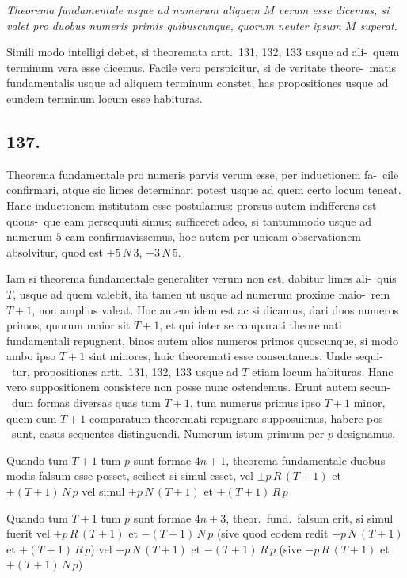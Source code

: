 \documentclass[12pt,a4paper]{article}
\theoremstyle{plain}
\theoremstyle{definition}
\theoremstyle{remark}
\begin{document}
\emph{Theorema fundamentale usque ad numerum aliquem $M$ verum esse dicemus, si
valet pro duobus numeris primis quibuscunque, quorum neuter ipsum $M$ superat.}

Simili modo intelligi debet, si theoremata artt.~131, 132, 133 usque ad ali-\ quem terminum vera esse dicemus. Facile vero perspicitur, si de veritate theore-\ matis fundamentalis usque ad aliquem terminum constet, has propositiones usque
ad eundem terminum locum esse habituras.

\subsection*{137.}

Theorema fundamentale pro numeris parvis verum esse, per inductionem fa-\ cile confirmari, atque sic limes determinari potest usque ad quem certo locum teneat.
Hanc inductionem institutam esse postulamus: prorsus autem indifferens est quous-\ que eam persequuti simus; sufficeret adeo, si tantummodo usque ad numerum $5$
eam confirmavissemus, hoc autem per unicam observationem absolvitur, quod est
$+5 \, N \, 3$, $+3 \, N \, 5$.

Iam si theorema fundamentale generaliter verum non est, dabitur limes ali-\ quis $T$, usque ad quem valebit, ita tamen ut usque ad numerum proxime maio-\ rem $T+1$, non amplius valeat. Hoc autem idem est ac si dicamus, dari duos
numeros primos, quorum maior sit $T+1$, et qui inter se comparati theoremati
fundamentali repugnent, binos autem alios numeros primos quoscunque, si modo
ambo ipso $T+1$ sint minores, huic theoremati esse consentaneos. Unde sequi-\ tur, propositiones artt.~131, 132, 133 usque ad $T$ etiam locum habituras. Hanc
vero suppositionem consistere non posse nunc ostendemus. Erunt autem secun-\ dum formas diversas quas tum $T+1$, tum numerus primus ipso $T+1$ minor,
quem cum $T+1$ comparatum theoremati repugnare supposuimus, habere pos-\ sunt, casus sequentes distinguendi. Numerum istum primum per $p$ designamus.

Quando tum $T+1$ tum $p$ sunt formae $4n+1$, theorema fundamentale
duobus modis falsum esse posset, scilicet si simul esset,
vel $\pm p \, R \, (T+1)$ et $\pm (T+1) \, N \, p$
vel simul $\pm p \, N \, (T+1)$ et $\pm (T+1) \, R \, p$

Quando tum $T+1$ tum $p$ sunt formae $4n+3$, theor.\ fund.\ falsum erit,
si simul fuerit
vel $+p \, R \, (T+1)$ et $-(T+1) \, N \, p$
(sive quod eodem redit $-p \, N \, (T+1)$ et $+(T+1) \, R \, p$)
vel $+p \, N \, (T+1)$ et $-(T+1) \, R \, p$
(sive $-p \, R \, (T+1)$ et $+(T+1) \, N \, p$)
\end{document}
